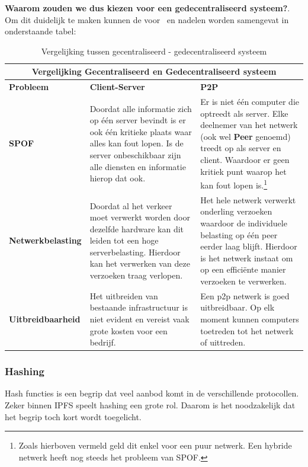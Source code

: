 \textbf{Waarom zouden we dus kiezen voor een gedecentraliseerd systeem?}. Om dit duidelijk te maken kunnen de voor~ en nadelen worden samengevat in onderstaande tabel:\\

\begin{table}[h!]
	\centering
	\begin{tabular}{ |p{3cm}|p{6cm}|p{6cm}|}
		\hline
		\multicolumn{3}{|c|}{Vergelijking Gecentraliseerd en Gedecentraliseerd systeem}\\
		\hline
		\textbf{Probleem}&\textbf{Client-Server}&\textbf{P2P}\\
		\hline
		\textbf{SPOF}&Doordat alle informatie zich op één server bevindt is er ook één kritieke plaats waar alles kan fout lopen. Is de server onbeschikbaar zijn alle diensten en informatie hierop dat ook.& Er is niet één computer die optreedt als server. Elke deelnemer van het netwerk (ook wel \textbf{Peer} genoemd) treedt op als server en client. Waardoor er geen kritiek punt waarop het kan fout lopen is.\footnote{Zoals hierboven vermeld geld dit enkel voor een puur netwerk. Een hybride netwerk heeft nog steeds het probleem van SPOF.}\\
		\hline
		\textbf{Netwerkbelasting}&Doordat al het verkeer moet verwerkt worden door dezelfde hardware kan dit leiden tot een hoge serverbelasting. Hierdoor kan het verwerken van deze verzoeken traag verlopen.&Het hele netwerk verwerkt onderling verzoeken waardoor de individuele belasting op één peer eerder laag blijft. Hierdoor is het netwerk instaat om op een efficiënte manier verzoeken te verwerken.\\
		\hline
		\textbf{Uitbreidbaarheid}&Het uitbreiden van bestaande infrastructuur is niet evident en vereist vaak grote kosten voor een bedrijf.&Een p2p netwerk is goed uitbreidbaar. Op elk moment kunnen computers toetreden tot het netwerk of uittreden.\\
		\hline
	\end{tabular}
	\label{tbl_concepts}
	\caption{Vergelijking tussen gecentraliseerd - gedecentraliseerd systeem}
\end{table}

\subsubsection{Hashing}
Hash functies is een begrip dat veel aanbod komt in de verschillende protocollen.  Zeker binnen IPFS speelt hashing een grote rol. Daarom is het noodzakelijk dat het begrip toch kort wordt toegelicht.\\

